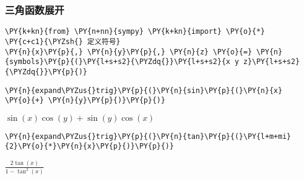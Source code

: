     \hypertarget{ux4e09ux89d2ux51fdux6570ux5c55ux5f00}{%
\subsubsection{三角函数展开}\label{ux4e09ux89d2ux51fdux6570ux5c55ux5f00}}

    \begin{tcolorbox}[breakable, size=fbox, boxrule=1pt, pad at break*=1mm,colback=cellbackground, colframe=cellborder]
\begin{Verbatim}[commandchars=\\\{\}]
\PY{k+kn}{from} \PY{n+nn}{sympy} \PY{k+kn}{import} \PY{o}{*}
\PY{c+c1}{\PYZsh{} 定义符号}
\PY{n}{x}\PY{p}{,} \PY{n}{y}\PY{p}{,} \PY{n}{z} \PY{o}{=} \PY{n}{symbols}\PY{p}{(}\PY{l+s+s2}{\PYZdq{}}\PY{l+s+s2}{x y z}\PY{l+s+s2}{\PYZdq{}}\PY{p}{)}
\end{Verbatim}
\end{tcolorbox}

    \begin{tcolorbox}[breakable, size=fbox, boxrule=1pt, pad at break*=1mm,colback=cellbackground, colframe=cellborder]
\begin{Verbatim}[commandchars=\\\{\}]
\PY{n}{expand\PYZus{}trig}\PY{p}{(}\PY{n}{sin}\PY{p}{(}\PY{n}{x} \PY{o}{+} \PY{n}{y}\PY{p}{)}\PY{p}{)}
\end{Verbatim}
\end{tcolorbox}
 
            
    
    $\displaystyle \sin{\left(x \right)} \cos{\left(y \right)} + \sin{\left(y \right)} \cos{\left(x \right)}$

    

    \begin{tcolorbox}[breakable, size=fbox, boxrule=1pt, pad at break*=1mm,colback=cellbackground, colframe=cellborder]
\begin{Verbatim}[commandchars=\\\{\}]
\PY{n}{expand\PYZus{}trig}\PY{p}{(}\PY{n}{tan}\PY{p}{(}\PY{l+m+mi}{2}\PY{o}{*}\PY{n}{x}\PY{p}{)}\PY{p}{)}
\end{Verbatim}
\end{tcolorbox}
 
            
    
    $\displaystyle \frac{2 \tan{\left(x \right)}}{1 - \tan^{2}{\left(x \right)}}$
